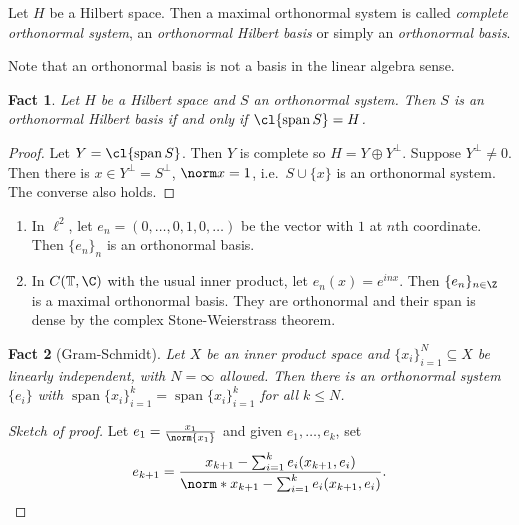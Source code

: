 \documentclass[a4paper]{article}
\newtheorem*{fact}{Fact}
\DeclareMathOperator{\spans}{span} %
\begin{document}
\begin{definition}
  Let \(H\) be a Hilbert space. Then a maximal orthonormal system is called \emph{complete orthonormal system}, an \emph{orthonormal Hilbert basis} or simply an \emph{orthonormal basis}.
\end{definition}

Note that an orthonormal basis is not a basis in the linear algebra sense.

\begin{fact}
  Let \(H\) be a Hilbert space and \(S\) an orthonormal system. Then \(S\) is an orthonormal Hilbert basis if and only if \(\cl{\spans S} = H\).
\end{fact}

\begin{proof}
  Let \(Y = \cl{\spans S}\). Then \(Y\) is complete so \(H = Y \oplus Y^\perp\). Suppose \(Y^\perp \neq 0\). Then there is \(x \in Y^\perp = S^\perp\), \(\norm x = 1\), i.e.\ \(S \cup \{x\}\) is an orthonormal system. The converse also holds.
\end{proof}

\begin{eg}\leavevmode
  \begin{enumerate}
  \item In \(\ell^2\), let \(e_n = (0, \dots, 0, 1, 0, \dots)\) be the vector with \(1\) at \(n\)th coordinate. Then \(\{e_n\}_n\) is an orthonormal basis.
  \item In \(C(\mathbb T, \C)\) with the usual inner product, let \(e_n(x) = e^{inx}\). Then \(\{e_n\}_{n \in \Z}\) is a maximal orthonormal basis. They are orthonormal and their span is dense by the complex Stone-Weierstrass theorem.
  \end{enumerate}
\end{eg}

\begin{fact}[Gram-Schmidt]
  Let \(X\) be an inner product space and \(\{x_i\}_{i = 1}^N \subseteq X\) be linearly independent, with \(N = \infty\) allowed. Then there is an orthonormal system \(\{e_i\}\) with \(\spans \{x_i\}_{i = 1}^k = \spans \{x_i\}_{i = 1}^k\) for all \(k \leq N\).
\end{fact}

\begin{proof}[Sketch of proof]
  Let \(e_1 = \frac{x_1}{\norm{x_1}}\) and given \(e_1, \dots, e_k\), set
  \[
    e_{k + 1} = \frac{x_{k + 1} - \sum_{i = 1}^k e_i(x_{k + 1}, e_i)}{\norm*{x_{k + 1} - \sum_{i = 1}^k e_i(x_{k + 1}, e_i)}}.
  \]
\end{proof}
\end{document}
